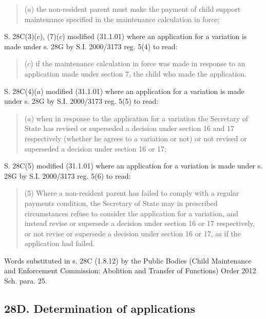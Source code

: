 \documentclass[12pt,a4paper]{article}
\begin{document}
{{\begin{quotation}
($a$) the non-resident parent must make the payment of
child support maintenance specified in the
maintenance calculation in force;
\end{quotation}

S. 28C(3)($c$), (7)($c$) modified (31.1.01) where an application for a variation is made under s. 28G by S.I. 2000/3173 reg. 5(4) to read:

\begin{quotation}
($c$) if the maintenance calculation in force was made
in response to an application made under section
7, the child who made the application.
\end{quotation}

S. 28C(4)($a$) modified (31.1.01) where an application for a variation is made under s. 28G by S.I. 2000/3173 reg. 5(5) to read:

\begin{quotation}
($a$) when in response to the application for a variation the Secretary of State has revised or superseded a decision under section 16 and 17 respectively (whether he agrees to a variation or not) or not revised or superseded a decision under section 16 or 17;
\end{quotation}

S. 28C(5) modified (31.1.01) where an application for a variation is made under s. 28G by S.I. 2000/3173 reg. 5(6) to read:

\begin{quotation}
(5) Where a non-resident parent has failed to comply with a regular payments condition, the Secretary of State may in prescribed circumstances refuse to consider the application for a variation, and instead revise or supersede a decision under section 16 or 17 respectively, or not revise or supersede a decision under section 16 or 17, as if the application had
failed.
\end{quotation}

Words substituted in s. 28C (1.8.12) by the Public Bodies (Child Maintenance and Enforcement Commission: Abolition and Transfer of Functions) Order 2012 Sch. para. 25.
}
}

\subsection{28D. Determination of applications}

\end{document}
